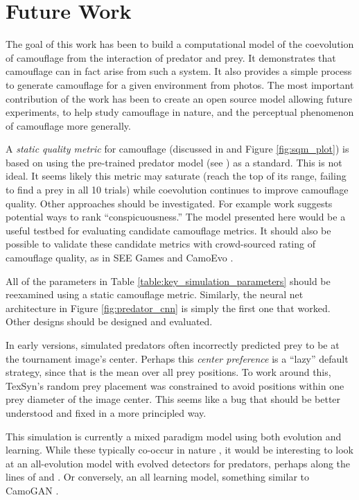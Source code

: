 \documentclass[letterpaper]{article}
\newcommand{\jargon}[1]{\textit{#1}}
\newcommand{\texsyn}[0]{TexSyn}
\begin{document}
\section{Future Work}
The goal of this work has been to build a computational model of the coevolution of camouflage from the interaction of predator and prey. It demonstrates that camouflage can in fact arise from such a system. It also provides a simple process to generate camouflage for a given environment from photos. The most important contribution of the work has been to create an open source model allowing future experiments, to help study camouflage in nature, and the perceptual phenomenon of camouflage more generally.
\par
A \jargon{static quality metric} for camouflage (discussed in  and Figure \ref{fig:sqm_plot}) is based on using the pre-trained predator model (see ) as a standard. This is not ideal. It seems likely this metric may saturate (reach the top of its range, failing to find a prey in all 10 trials) while coevolution continues to improve camouflage quality. Other approaches should be investigated. For example work \cite{lv_cod_2022} suggests potential ways to rank “conspicuousness.” The model presented here would be a useful testbed for evaluating candidate camouflage metrics. It should also be possible to validate these candidate metrics with crowd-sourced rating of camouflage quality, as in SEE Games \cite{stevens_games_2022} and CamoEvo \cite{hancock_camoevo_2022}.
\par
All of the parameters in Table \ref{table:key_simulation_parameters} should be reexamined using a static camouflage metric. Similarly, the neural net architecture in Figure \ref{fig:predator_cnn} is simply the first one that worked. Other designs should be designed and evaluated.
\par
\par
In early versions, simulated predators often incorrectly predicted prey to be at the tournament image's center. Perhaps this \jargon{center preference} is a “lazy” default strategy, since that is the mean over all prey positions. To work around this, \texsyn{}'s random prey placement was constrained to avoid positions within one prey diameter of the image center. This seems like a bug that should be better understood and fixed in a more principled way.
\par
This simulation is currently a mixed paradigm model using both evolution and learning. While these typically co-occur in nature \cite{valiant_probably_2013}, it would be interesting to look at an all-evolution model with evolved detectors for predators, perhaps along the lines of \citet{harrington_coevolution_2014} and \citet{bi_genetic_2022}. Or conversely, an all learning model, something similar to CamoGAN \cite{talas_camogan_2020}.
\end{document}
